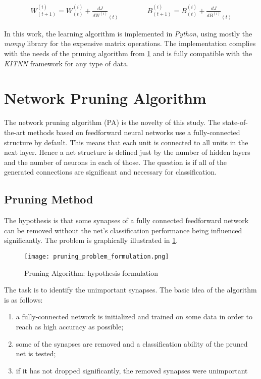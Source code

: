 \begin{align} \label{eq:params_update}
W_{(t+1)}^{(i)} = W_{(t)}^{(i)} + \frac{dJ}{dW^{(i)}}_{(t)} \qquad\qquad B_{(t+1)}^{(i)} = B_{(t)}^{(i)} + \frac{dJ}{dB^{(i)}}_{(t)}
\end{align}

In this work, the learning algorithm is implemented in \textit{Python}, using mostly the \textit{numpy} library for the expensive matrix operations. The implementation complies with the needs of the pruning algorithm from \cref{sec:network_pruning_algorithm} and is fully compatible with the \textit{KITNN} framework for any type of data.

\section{Network Pruning Algorithm} \label{sec:network_pruning_algorithm}
The network pruning algorithm (PA) is the novelty of this study. The state-of-the-art methods based on feedforward neural networks use a fully-connected structure by default. This means that each unit is connected to all units in the next layer. Hence a net structure is defined just by the number of hidden layers and the number of neurons in each of those. The question is if all of the generated connections are significant and necessary for classification.

\subsection{Pruning Method} \label{ssec:pa_method}
The hypothesis is that some synapses of a fully connected feedforward network can be removed without the net's classification performance being influenced significantly. The problem is graphically illustrated in \cref{img:pruning_problem_formulation}.

\begin{figure}[H]
  \centering
  \texttt{[image: pruning\_problem\_formulation.png]}
  \caption{Pruning Algorithm: hypothesis formulation}
  \label{img:pruning_problem_formulation}
\end{figure}

The task is to identify the unimportant synapses. The basic idea of the algorithm is as follows:
\begin{enumerate}
\item a fully-connected network is initialized and trained on some data in order to reach as high accuracy as possible;
\item some of the synapses are removed and a classification ability of the pruned net is tested;
\item if it has not dropped significantly, the removed synapses were unimportant
\end{enumerate}

